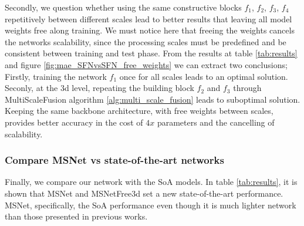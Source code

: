\documentclass[10pt]{article}
\begin{document}
Secondly, we question whether using the same constructive blocks $f_1$, $f_2$, $f_3$, $f_4$ repetitively between different scales lead to better results that leaving all model weights free along training. We must notice here that freeing the weights cancels the networks scalability, since the processing scales must be predefined and be consistent between training and test phase. From the results at table \ref{tab:results} and figure \ref{fig:mae_SFNvsSFN_free_weights} we can extract two conclusions; Firstly, training the network $f_1$ once for all scales leads to an optimal solution. Seconly, at the 3d level, repeating the building block $f_2$ and $f_3$ through MultiScaleFusion algorithm \ref{alg:multi_scale_fusion} leads to suboptimal solution. Keeping the same backbone architecture, with free weights between scales, provides better accuracy in the cost of $4x$ parameters and the cancelling of scalability.

\subsubsection{Compare MSNet vs state-of-the-art networks}

Finally, we compare our network with the SoA models. In table \ref{tab:results}, it is shown that MSNet and MSNetFree3d set a new state-of-the-art performance. MSNet, specifically, the SoA performance even though it is much lighter network than those presented in previous works.
\end{document}
